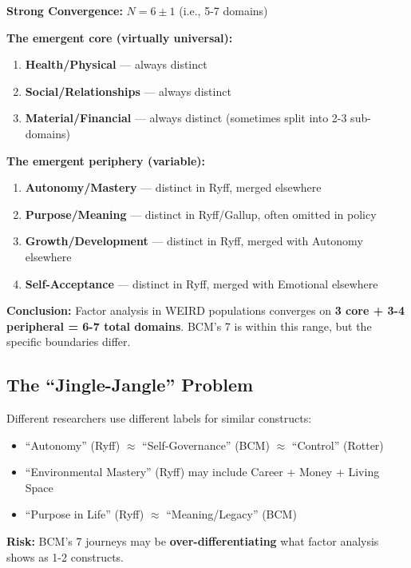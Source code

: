 \begin{tcolorbox}[colback=green!5!white, colframe=green!75!black, title=Empirical Answer: Where Does N Emerge?]

\textbf{Strong Convergence:} $N = 6 \pm 1$ (i.e., 5-7 domains)

\textbf{The emergent core (virtually universal):}
\begin{enumerate}[nosep]
\item \textbf{Health/Physical} --- always distinct
\item \textbf{Social/Relationships} --- always distinct
\item \textbf{Material/Financial} --- always distinct (sometimes split into 2-3 sub-domains)
\end{enumerate}

\textbf{The emergent periphery (variable):}
\begin{enumerate}[nosep, start=4]
\item \textbf{Autonomy/Mastery} --- distinct in Ryff, merged elsewhere
\item \textbf{Purpose/Meaning} --- distinct in Ryff/Gallup, often omitted in policy
\item \textbf{Growth/Development} --- distinct in Ryff, merged with Autonomy elsewhere
\item \textbf{Self-Acceptance} --- distinct in Ryff, merged with Emotional elsewhere
\end{enumerate}

\textbf{Conclusion:} Factor analysis in WEIRD populations converges on \textbf{3 core + 3-4 peripheral = 6-7 total domains}. BCM's 7 is within this range, but the specific boundaries differ.

\end{tcolorbox}

\subsection{The ``Jingle-Jangle'' Problem}

\begin{tcolorbox}[colback=orange!5!white, colframe=orange!75!black, title=Methodological Warning]
Different researchers use different labels for similar constructs:
\begin{itemize}[nosep]
\item ``Autonomy'' (Ryff) $\approx$ ``Self-Governance'' (BCM) $\approx$ ``Control'' (Rotter)
\item ``Environmental Mastery'' (Ryff) may include Career + Money + Living Space
\item ``Purpose in Life'' (Ryff) $\approx$ ``Meaning/Legacy'' (BCM)
\end{itemize}

\textbf{Risk:} BCM's 7 journeys may be \textbf{over-differentiating} what factor analysis shows as 1-2 constructs.
\end{tcolorbox}

